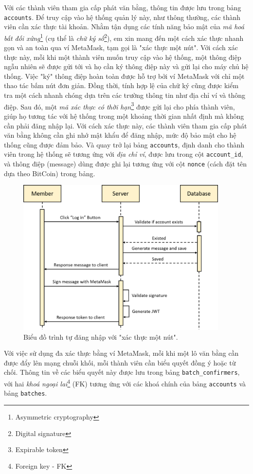 Với các thành viên tham gia cấp phát văn bằng, thông tin được lưu trong bảng \texttt{accounts}. Để truy cập vào hệ thống quản lý này, như thông thường, các thành viên cần xác thực tài khoản. Nhằm tận dụng các tính năng bảo mật của \textit{mã hoá bất đối xứng}\footnote{Asymmetric cryptography} (cụ thể là \textit{chữ ký số}\footnote{Digital signature}), em xin mang đến một cách xác thực nhanh gọn và an toàn qua ví MetaMask, tạm gọi là "xác thực một nút". Với cách xác thực này, mỗi khi một thành viên muốn truy cập vào hệ thống, một thông điệp ngẫu nhiên sẽ được gửi tới và họ cần ký thông điệp này và gửi lại cho máy chủ hệ thống. Việc "ký" thông điệp hoàn toàn được hỗ trợ bởi ví MetaMask với chỉ một thao tác bấm nút đơn giản. Đồng thời, tính hợp lệ của chữ ký cũng được kiểm tra một cách nhanh chóng dựa trên các trường thông tin như địa chỉ ví và thông điệp. Sau đó, một \textit{mã xác thực có thời hạn}\footnote{Expirable token} được gửi lại cho phía thành viên, giúp họ tương tác với hệ thống trong một khoảng thời gian nhất định mà không cần phải đăng nhập lại. Với cách xác thực này, các thành viên tham gia cấp phát văn bằng không cần ghi nhớ mật khẩu để đăng nhập, mức độ bảo mật cho hệ thống cũng được đảm bảo. Và quay trở lại bảng \texttt{accounts}, định danh cho thành viên trong hệ thống sẽ tương ứng với \textit{địa chỉ ví}, được lưu trong cột \texttt{account\_id}, và thông điệp (message) dùng được ghi lại tương ứng với cột \texttt{nonce} (cách đặt tên dựa theo BitCoin) trong bảng.\\

\clearpage
\begin{figure}[ht]
    \centering
    \includegraphics[width=400px]{images/login-flow.png}
    \caption{Biểu đồ trình tự đăng nhập với "xác thực một nút".}
\end{figure}

Với việc sử dụng đa xác thực bằng ví MetaMask, mỗi khi một lô văn bằng cần được đẩy lên mạng chuỗi khối, mỗi thành viên cần biểu quyết đồng ý hoặc từ chối. Thông tin về các biểu quyết này được lưu trong bảng \texttt{batch\_confirmers}, với hai \textit{khoá ngoại lai}\footnote{Foreign key - FK} (FK) tương ứng với các khoá chính của bảng \texttt{accounts} và bảng \texttt{batches}.\\

